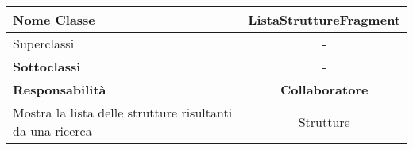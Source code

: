 
\setcounter{table}{0}
\begin{table}[H]
    \centering
    \begin{tabularx}{\textwidth}{||   X  ||  c   ||}
        \hline
        \rowcolor{Gray}
        \textbf{Nome Classe} & ListaStruttureFragment\\
        \hline
        Superclassi  &  - \\
        \hline
        \textbf{Sottoclassi} & - \\
        \hline
        \hline
         \textbf{Responsabilità} & \textbf{Collaboratore} \\
         \hline
          Mostra la lista delle strutture risultanti da una ricerca & Strutture \\
         \hline
    \end{tabularx}
\end{table}
